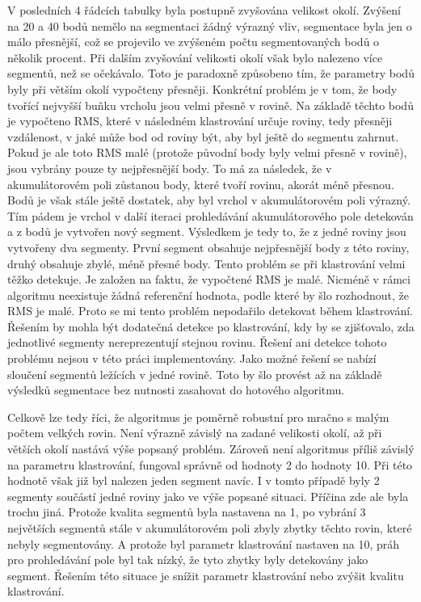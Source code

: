 \documentclass[11pt,twoside,a4paper]{book}
\begin{document}
V posledních 4 řádcích tabulky byla postupně zvyšována velikost okolí. Zvýšení na 20 a 40 bodů nemělo na segmentaci žádný výrazný vliv, segmentace byla jen o málo přesnější, což se projevilo ve zvýšeném počtu segmentovaných bodů o několik procent. Při dalším zvyšování velikosti okolí však bylo nalezeno více segmentů, než se očekávalo. Toto je paradoxně způsobeno tím, že parametry bodů byly při větším okolí vypočteny přesněji. Konkrétní problém je v tom, že body tvořící nejvyšší buňku vrcholu jsou velmi přesně v rovině. Na základě těchto bodů je vypočteno RMS, které v následném klastrování určuje  roviny, tedy přesněji vzdálenost, v jaké může bod od roviny být, aby byl ještě do segmentu zahrnut. Pokud je ale toto RMS malé (protože původní body byly  velmi přesně v rovině), jsou vybrány pouze ty nejpřesnější body. To má za následek, že v akumulátorovém poli zůstanou body, které tvoří rovinu, akorát méně přesnou. Bodů je však stále ještě dostatek, aby byl vrchol v akumulátorovém poli výrazný. Tím pádem je vrchol v další iteraci prohledávání akumulátorového pole detekován a z bodů je vytvořen nový segment. Výsledkem je tedy to, že z jedné roviny jsou vytvořeny dva segmenty. První segment obsahuje nejpřesnější body z této roviny, druhý obsahuje zbylé, méně přesné body. Tento problém se při klastrování velmi těžko detekuje. Je založen na faktu, že vypočtené RMS je malé. Nicméně v rámci algoritmu neexistuje žádná referenční hodnota, podle které by šlo rozhodnout, že RMS je malé. Proto se mi tento problém nepodařilo detekovat během klastrování. Řešením by mohla být dodatečná detekce po klastrování, kdy by se zjišťovalo, zda jednotlivé segmenty nereprezentují stejnou rovinu. Řešení ani detekce tohoto problému nejsou v této práci implementovány. Jako možné řešení se nabízí sloučení segmentů ležících v jedné rovině. Toto by šlo provést až na základě výsledků segmentace bez nutnosti zasahovat do hotového algoritmu.

Celkově lze tedy říci, že algoritmus je poměrně robustní pro mračno s malým počtem velkých rovin. Není výrazně závislý na zadané velikosti okolí, až při větších okolí nastává výše popsaný problém. Zároveň není algoritmus příliš závislý na parametru klastrování, fungoval správně od hodnoty 2 do hodnoty 10. Při této hodnotě však již byl nalezen jeden segment navíc. I v tomto případě byly 2 segmenty součástí jedné roviny jako ve výše popsané situaci. Příčina zde ale byla trochu jiná. Protože kvalita segmentů byla nastavena na 1, po vybrání 3 největších segmentů stále v akumulátorovém poli zbyly zbytky těchto rovin, které nebyly segmentovány. A protože byl parametr klastrování nastaven na 10, práh pro prohledávání pole byl tak nízký, že tyto zbytky byly detekovány jako segment. Řešením této situace je snížit parametr klastrování nebo zvýšit kvalitu klastrování. 
\end{document}
